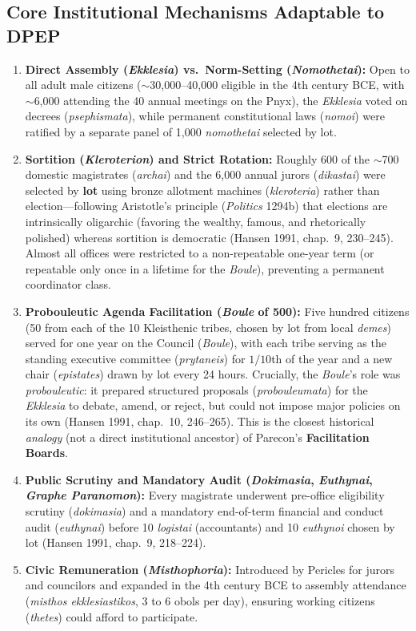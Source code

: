 \documentclass[10pt,twoside,openany]{book}
\theoremstyle{dpepstyle}
\begin{document}
\subsection{Core Institutional Mechanisms Adaptable to DPEP}
\begin{enumerate}[leftmargin=1.8em,itemsep=2pt]
  \item \textbf{Direct Assembly (\emph{Ekklesia}) vs.\ Norm-Setting (\emph{Nomothetai}):} Open to all adult male citizens ($\sim$30,000--40,000 eligible in the 4th century BCE, with $\sim$6,000 attending the 40 annual meetings on the Pnyx), the \emph{Ekklesia} voted on decrees (\emph{psephismata}), while permanent constitutional laws (\emph{nomoi}) were ratified by a separate panel of 1,000 \emph{nomothetai} selected by lot.
  \item \textbf{Sortition (\emph{Kleroterion}) and Strict Rotation:} Roughly 600 of the $\sim$700 domestic magistrates (\emph{archai}) and the 6,000 annual jurors (\emph{dikastai}) were selected by \textbf{lot} using bronze allotment machines (\emph{kleroteria}) rather than election---following Aristotle's principle (\emph{Politics} 1294b) that elections are intrinsically oligarchic (favoring the wealthy, famous, and rhetorically polished) whereas sortition is democratic (Hansen 1991, chap.~9, 230--245). Almost all offices were restricted to a non-repeatable one-year term (or repeatable only once in a lifetime for the \emph{Boule}), preventing a permanent coordinator class.
  \item \textbf{Probouleutic Agenda Facilitation (\emph{Boule} of 500):} Five hundred citizens (50 from each of the 10 Kleisthenic tribes, chosen by lot from local \emph{demes}) served for one year on the Council (\emph{Boule}), with each tribe serving as the standing executive committee (\emph{prytaneis}) for $1/10$th of the year and a new chair (\emph{epistates}) drawn by lot every 24 hours. Crucially, the \emph{Boule}'s role was \emph{probouleutic}: it prepared structured proposals (\emph{probouleumata}) for the \emph{Ekklesia} to debate, amend, or reject, but could not impose major policies on its own (Hansen 1991, chap.~10, 246--265). This is the closest historical \emph{analogy} (not a direct institutional ancestor) of Parecon's \textbf{Facilitation Boards}.
  \item \textbf{Public Scrutiny and Mandatory Audit (\emph{Dokimasia}, \emph{Euthynai}, \emph{Graphe Paranomon}):} Every magistrate underwent pre-office eligibility scrutiny (\emph{dokimasia}) and a mandatory end-of-term financial and conduct audit (\emph{euthynai}) before 10 \emph{logistai} (accountants) and 10 \emph{euthynoi} chosen by lot (Hansen 1991, chap.~9, 218--224).
  \item \textbf{Civic Remuneration (\emph{Misthophoria}):} Introduced by Pericles for jurors and councilors and expanded in the 4th century BCE to assembly attendance (\emph{misthos ekklesiastikos}, 3 to 6 obols per day), ensuring working citizens (\emph{thetes}) could afford to participate.
\end{enumerate}
\end{document}
